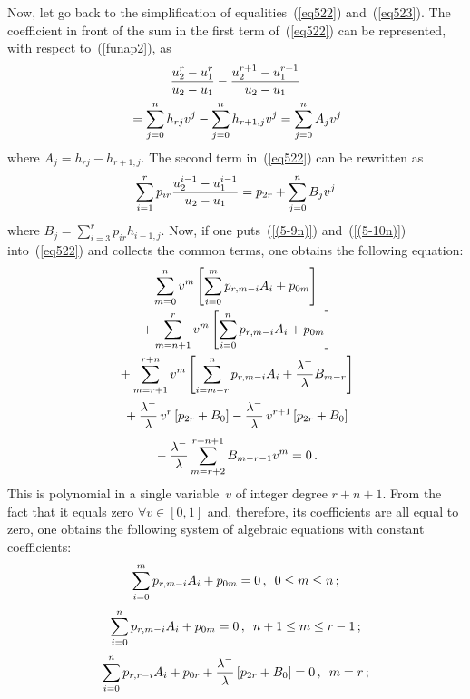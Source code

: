\begin{multicols}{2}
Now, let go back to the simplification of equalities~(\ref{eq522}) and~(\ref{eq523}).
The coefficient in front of the sum in the first term 
of~(\ref{eq522}) can be represented, with respect to~(\ref{funap2}), as
\begin{multline}
\label{(5-9n)}
\displaystyle\frac{\displaystyle u_2^r -u_1^r\mathstrut}{\displaystyle u_2 - u_1\mathstrut}- \displaystyle\frac{\displaystyle u_2^{r+1} -u_1^{r+1}\mathstrut}{\displaystyle u_2 - u_1\mathstrut}\\
{}=\sum\limits_{j=0}^n h_{rj} v^j- \sum\limits_{j=0}^n h_{r+1,j} v^j
=
\sum\limits_{j=0}^n A_j v^j 
\end{multline}
where $A_j=h_{rj} - h_{r+1,j}$. The second term in~(\ref{eq522})
can be rewritten as 
\begin{equation}
\label{(5-10n)}
\sum\limits_{i=1}^{r} p_{ir} \displaystyle\frac{\displaystyle u_2^{i-1} -u_1^{i-1} \mathstrut}{\displaystyle u_2 - u_1\mathstrut}
=p_{2r} + \sum\limits_{j=0}^n B_j v^j
\end{equation}
where $B_j=\sum_{i=3}^{r} p_{ir} h_{i-1,j}$. Now, if one puts~(\ref{(5-9n)})
and~(\ref{(5-10n)}) into~(\ref{eq522}) and
collects the common terms, one obtains the following equation:
\begin{multline*}
\sum\limits_{m=0}^{n}  v^m \left[ \sum\limits_{i=0}^m
p_{r,m-i} A_i + p_{0m}\right]\\
{} + \sum\limits_{m=n+1}^{r}  v^m \left[\sum_{i=0}^n
p_{r,m-i} A_i + p_{0m}\right]  \\
{}+
\sum\limits_{m=r+1}^{r+n}  v^m \left[ \sum\limits_{i=m-r}^n p_{r,m-i} A_i +
\displaystyle\frac{\displaystyle \lambda^- \mathstrut}{\displaystyle \lambda \mathstrut}B_{m-r}\right]\\
{} +
\displaystyle\frac{\displaystyle \lambda^-\mathstrut}{\displaystyle \lambda \mathstrut}\, v^r \left[p_{2r}+B_0\right]  - 
\displaystyle\frac{\displaystyle \lambda^-\mathstrut}{\displaystyle \lambda \mathstrut}\, v^{r+1} \left[p_{2r}+B_0\right]\\
{} -
\displaystyle\frac{\displaystyle \lambda^- \mathstrut}{\displaystyle \lambda \mathstrut} \sum\limits_{m=r+2}^{r+n+1} B_{m-r-1} v^{m}=0\,.
\end{multline*}
This is polynomial in a single variable~$v$ of integer degree $r+n+1$.
From the fact that it equals zero $\forall v \in [0,1]$ and,
therefore, its coefficients are all equal to zero, one obtains the following system
of algebraic equations with constant coefficients:
\begin{equation}
\label{(5-18n)}
\sum\limits_{i=0}^m p_{r,m-i} A_i + p_{0m}=0\,, \enskip 0 \le m \le n\,;
\end{equation}
\begin{equation}
\sum\limits_{i=0}^n p_{r,m-i} A_i + p_{0m}=0\,, \enskip n+1 \le m \le r-1\,;
\label{5-18na}
\end{equation}
\begin{equation}
\sum\limits_{i=0}^n p_{r,r-i} A_i + p_{0r} + \displaystyle\frac{\displaystyle \lambda^-\mathstrut}{\displaystyle \lambda \mathstrut}
\left[p_{2r}+B_0\right] =0\,, \enskip m=r\,; 
\label{5-18nb}
\end{equation}


\end{multicols}
